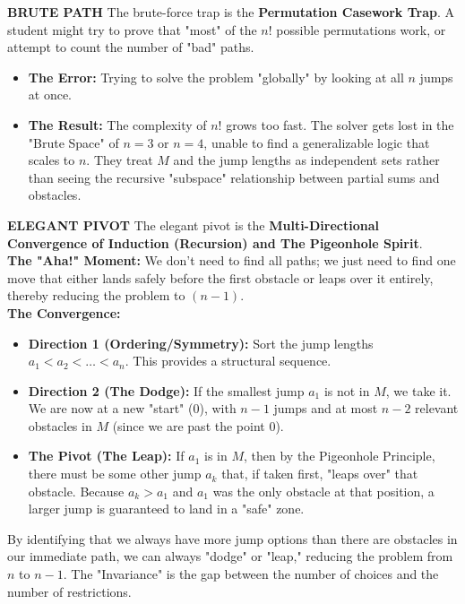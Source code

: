 \documentclass{article}
\begin{document}
\noindent \textbf{BRUTE PATH}
The brute-force trap is the \textbf{Permutation Casework Trap}. A student might try to prove that "most" of the $n!$ possible permutations work, or attempt to count the number of "bad" paths.
\begin{itemize}
    \item \textbf{The Error:} Trying to solve the problem "globally" by looking at all $n$ jumps at once.
    \item \textbf{The Result:} The complexity of $n!$ grows too fast. The solver gets lost in the "Brute Space" of $n=3$ or $n=4$, unable to find a generalizable logic that scales to $n$. They treat $M$ and the jump lengths as independent sets rather than seeing the recursive "subspace" relationship between partial sums and obstacles.
\end{itemize}

\noindent \textbf{ELEGANT PIVOT}
The elegant pivot is the \textbf{Multi-Directional Convergence of Induction (Recursion) and The Pigeonhole Spirit}. \\
\textbf{The "Aha!" Moment:} We don't need to find all paths; we just need to find one move that either lands safely before the first obstacle or leaps over it entirely, thereby reducing the problem to $(n-1)$. \\
\textbf{The Convergence:}
\begin{itemize}
    \item \textbf{Direction 1 (Ordering/Symmetry):} Sort the jump lengths $a_1 < a_2 < \dots < a_n$. This provides a structural sequence.
    \item \textbf{Direction 2 (The Dodge):} If the smallest jump $a_1$ is not in $M$, we take it. We are now at a new "start" (0), with $n-1$ jumps and at most $n-2$ relevant obstacles in $M$ (since we are past the point 0).
    \item \textbf{The Pivot (The Leap):} If $a_1$ is in $M$, then by the Pigeonhole Principle, there must be some other jump $a_k$ that, if taken first, "leaps over" that obstacle. Because $a_k > a_1$ and $a_1$ was the only obstacle at that position, a larger jump is guaranteed to land in a "safe" zone.
\end{itemize}
By identifying that we always have more jump options than there are obstacles in our immediate path, we can always "dodge" or "leap," reducing the problem from $n$ to $n-1$. The "Invariance" is the gap between the number of choices and the number of restrictions.\\
\end{document}
